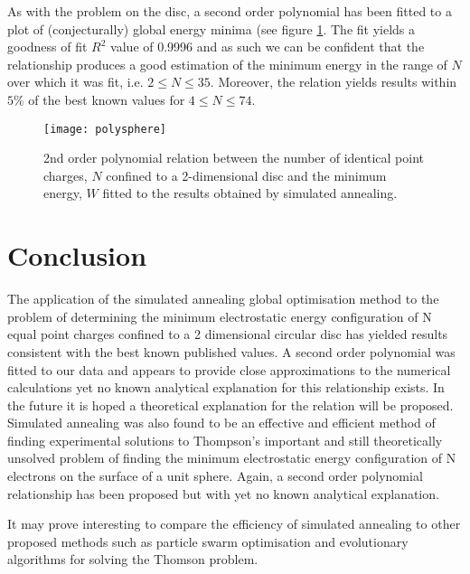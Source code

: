 \documentclass[12pt,a4paper,final]{iopart}
\begin{document}
{As with the problem on the disc, a second order polynomial has been fitted to a plot of (conjecturally) global energy minima (see figure \ref{fig:polysphere}. The fit yields a goodness of fit $R^2$ value of 0.9996 and as such we can be confident that the relationship produces a good estimation of the minimum energy in the range of $N$ over which it was fit, i.e. $2 \leq N \leq 35$. Moreover, the relation  yields results within $5\%$ of the best known values for $4 \leq N \leq 74$. 
 
 


\begin{figure}\label{fig:polysphere}
\centering
\texttt{[image: polysphere]}
\caption{2nd order polynomial relation between the number of identical point charges, $N$ confined to a 2-dimensional disc and the minimum energy, $W$ fitted to the results obtained by simulated annealing.}
\end{figure}
 



\section{Conclusion}

The application of the simulated annealing global optimisation method to the problem of determining the minimum electrostatic energy configuration of N equal point charges confined to a 2 dimensional circular disc has yielded results consistent with the best known published values. A second order polynomial was fitted to our data and appears to provide close approximations to the numerical calculations yet no known analytical explanation for this relationship exists. In the future it is hoped a theoretical explanation for the relation will be proposed.  
Simulated annealing was also found to be an effective and efficient method of finding experimental solutions to Thompson’s important and still theoretically unsolved problem of finding the minimum electrostatic energy configuration of N electrons on the surface of a unit sphere. Again, a second order polynomial relationship has been proposed but with yet no known analytical explanation.  

It may prove interesting to compare the efficiency of simulated annealing to other proposed methods such as particle swarm optimisation \cite{swarm} and evolutionary algorithms \cite{evolve} for solving the Thomson problem. 






}
\end{document}
